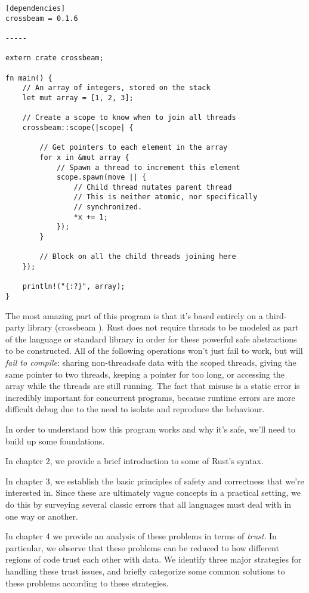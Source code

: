 \begin{verbatim}
[dependencies]
crossbeam = 0.1.6

-----

extern crate crossbeam;

fn main() {
    // An array of integers, stored on the stack
    let mut array = [1, 2, 3];

    // Create a scope to know when to join all threads
    crossbeam::scope(|scope| {

        // Get pointers to each element in the array
        for x in &mut array {
            // Spawn a thread to increment this element
            scope.spawn(move || {
                // Child thread mutates parent thread
                // This is neither atomic, nor specifically
                // synchronized.
                *x += 1;
            });
        }

        // Block on all the child threads joining here
    });

    println!("{:?}", array);
}
\end{verbatim}

The most amazing part of this program is that it's based entirely on a third-
party library (crossbeam \cite{crossbeam}). Rust does not require threads to be modeled as part
of the language or standard library in order for these powerful safe
abstractions to be constructed. All of the following operations won't just fail
to work, but will \emph{fail to compile}: sharing non-threadsafe data with
the scoped threads, giving the same pointer to two threads, keeping a pointer for too
long, or accessing the array while the threads are still running. The fact that
misuse is a static error is incredibly important for concurrent programs, because
runtime errors are more difficult debug due to the need to isolate and reproduce
the behaviour.

In order to understand how this program works and why it's safe, we'll need to
build up some foundations.

In chapter 2, we provide a brief introduction to some of Rust's syntax.

In chapter 3, we establish the basic principles of
safety and correctness that we're interested in. Since these are ultimately
vague concepts in a practical setting, we do this by surveying several classic
errors that all languages must deal with in one way or another.

In chapter 4 we provide an analysis of these problems in terms of \emph{trust}.
In particular, we observe that these problems can be reduced to how different
regions of code trust each other with data. We identify three major strategies for handling
these trust issues, and briefly categorize some common solutions to these problems
according to these strategies.


